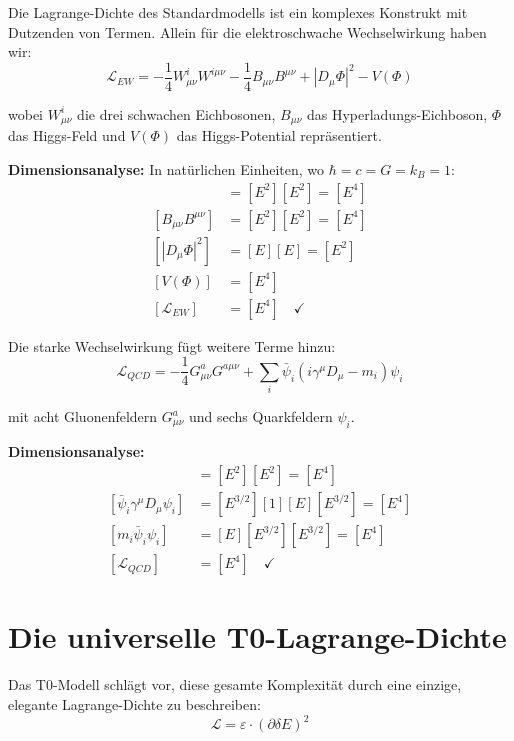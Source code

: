 \documentclass[12pt,a4paper]{report}
\newcommand{\natunits}{\hbar = c = G = k_B = 1} %
\begin{document}
	Die Lagrange-Dichte des Standardmodells ist ein komplexes Konstrukt mit Dutzenden von Termen. Allein für die elektroschwache Wechselwirkung haben wir:
	\begin{equation}
		\mathcal{L}_{EW} = -\frac{1}{4} W_{\mu\nu}^i W^{i\mu\nu} - \frac{1}{4} B_{\mu\nu}B^{\mu\nu} + |D_\mu\Phi|^2 - V(\Phi)
	\end{equation}
	
	wobei $W_{\mu\nu}^i$ die drei schwachen Eichbosonen, $B_{\mu\nu}$ das Hyperladungs-Eichboson, $\Phi$ das Higgs-Feld und $V(\Phi)$ das Higgs-Potential repräsentiert.
	
	\textbf{Dimensionsanalyse:} In natürlichen Einheiten, wo $\natunits$:
	\begin{align}
		[W_{\mu\nu}^i W^{i\mu\nu}] &= [E^2][E^2] = [E^4] \\
		[B_{\mu\nu}B^{\mu\nu}] &= [E^2][E^2] = [E^4] \\
		[|D_\mu\Phi|^2] &= [E][E] = [E^2] \\
		[V(\Phi)] &= [E^4] \\
		[\mathcal{L}_{EW}] &= [E^4] \quad \checkmark
	\end{align}
	
	Die starke Wechselwirkung fügt weitere Terme hinzu:
	\begin{equation}
		\mathcal{L}_{QCD} = -\frac{1}{4} G_{\mu\nu}^a G^{a\mu\nu} + \sum_i \bar{\psi}_i(i\gamma^\mu D_\mu - m_i)\psi_i
	\end{equation}
	
	mit acht Gluonenfeldern $G_{\mu\nu}^a$ und sechs Quarkfeldern $\psi_i$.
	
	\textbf{Dimensionsanalyse:}
	\begin{align}
		[G_{\mu\nu}^a G^{a\mu\nu}] &= [E^2][E^2] = [E^4] \\
		[\bar{\psi}_i\gamma^\mu D_\mu\psi_i] &= [E^{3/2}][1][E][E^{3/2}] = [E^4] \\
		[m_i\bar{\psi}_i\psi_i] &= [E][E^{3/2}][E^{3/2}] = [E^4] \\
		[\mathcal{L}_{QCD}] &= [E^4] \quad \checkmark
	\end{align}
	
	\section{Die universelle T0-Lagrange-Dichte}
	
	Das T0-Modell schlägt vor, diese gesamte Komplexität durch eine einzige, elegante Lagrange-Dichte zu beschreiben:
	\begin{equation}
		\boxed{\mathcal{L} = \varepsilon \cdot (\partial\delta E)^2}
		\label{eq:universal_lagrangian}
	\end{equation}
	
\end{document}
